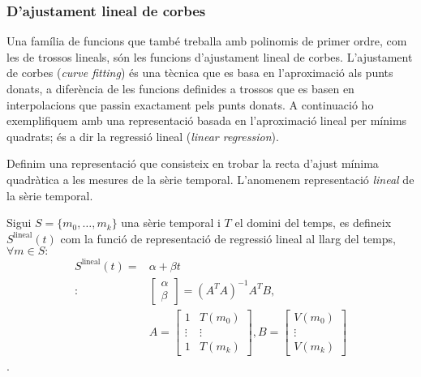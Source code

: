 \subsubsection{D'ajustament lineal de corbes}

Una família de funcions que també treballa amb polinomis de primer
ordre, com les de trossos lineals, són les funcions d'ajustament
lineal de corbes.  L'ajustament de corbes (\emph{curve fitting}) és
una tècnica que es basa en l'aproximació als punts donats, a
diferència de les funcions definides a trossos que es basen en
interpolacions que passin exactament pels punts donats.  A continuació
ho exemplifiquem amb una representació basada en l'aproximació lineal
per mínims quadrats; és a dir la regressió lineal (\emph{linear
  regression}).


Definim una representació que consisteix en trobar la recta d'ajust
mínima quadràtica a les mesures de la sèrie temporal. L'anomenem
representació \emph{lineal} de la sèrie temporal.
\begin{definition}
  Sigui $S=\{m_0,\ldots,m_k\}$ una sèrie temporal i $T$ el domini del
  temps, es defineix $S^\text{lineal}(t)$ com la funció de
  representació de regressió lineal al llarg del temps, $\forall m \in
  S:$
  \begin{align*}
    S^\text{lineal}(t) = & \alpha + \beta t \\
    :\; & 
    \left[\begin{array}{c}
        \alpha \\
        \beta
      \end{array}\right] 
    = (A^TA)^{-1}A^TB, \\
    & A=\left[\begin{array}{cc}
        1 & T(m_0) \\
        \vdots & \vdots \\
        1 & T(m_k)
      \end{array}\right],
    B=\left[\begin{array}{c}
        V(m_0) \\
        \vdots \\
        V(m_k)
      \end{array}\right]       
   \end{align*}.
\end{definition}



